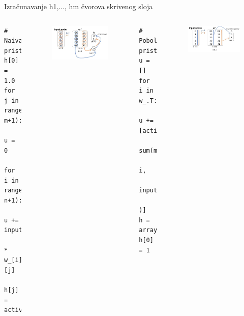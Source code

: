 \documentclass{beamer}
\begin{document}
\begin{frame}[fragile]{Izračunavanje h1,..., hm čvorova skrivenog sloja}
\begin{columns}
    \begin{Verbatim}[fontsize=\small]
# Naivan pristup
h[0] = 1.0
for j in range(1, m+1):
    u = 0
    for i in range(0, n+1):
        u += input_nodes[i] 
            * w_[i][j]
    h[j] = activation_f(u)
    \end{Verbatim}
    \begin{figure}
        \centering
        \includegraphics[scale=0.4]{naivno_izracunavanje_w_.JPG}
    \end{figure}
    
    \begin{Verbatim}[fontsize=\small]
# Poboljsan pristup
u = []
for i in w_.T:
    u += [activation_f(
            sum(multiply(
                i, 
                input_nodes))
          )]
h = array(u)
h[0] = 1
    \end{Verbatim}
    \begin{figure}
        \centering
        \includegraphics[scale=0.4]{izracunavanje_w_.JPG}
    \end{figure}
    
\end{columns}

\end{frame}
\end{document}
